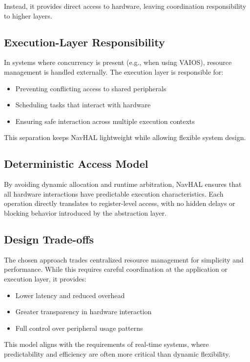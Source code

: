 Instead, it provides direct access to hardware, leaving coordination responsibility to higher layers.

\subsection*{Execution-Layer Responsibility}

In systems where concurrency is present (e.g., when using VAIOS), resource management is handled externally. The execution layer is responsible for:

\begin{itemize}
    \item Preventing conflicting access to shared peripherals
    \item Scheduling tasks that interact with hardware
    \item Ensuring safe interaction across multiple execution contexts
\end{itemize}

This separation keeps NavHAL lightweight while allowing flexible system design.

\subsection*{Deterministic Access Model}

By avoiding dynamic allocation and runtime arbitration, NavHAL ensures that all hardware interactions have predictable execution characteristics. Each operation directly translates to register-level access, with no hidden delays or blocking behavior introduced by the abstraction layer.

\subsection*{Design Trade-offs}

The chosen approach trades centralized resource management for simplicity and performance. While this requires careful coordination at the application or execution layer, it provides:

\begin{itemize}
    \item Lower latency and reduced overhead
    \item Greater transparency in hardware interaction
    \item Full control over peripheral usage patterns
\end{itemize}

This model aligns with the requirements of real-time systems, where predictability and efficiency are often more critical than dynamic flexibility.